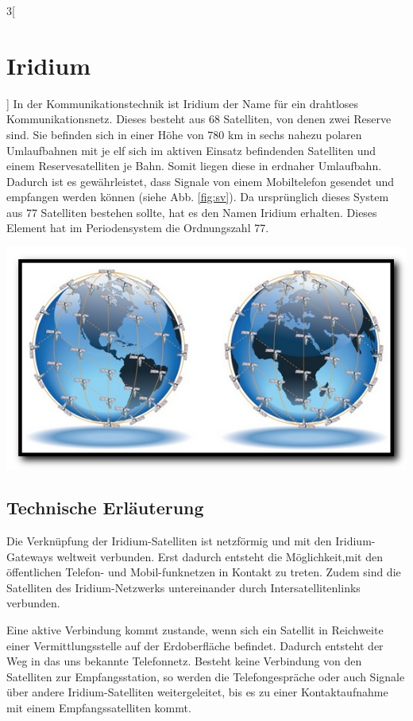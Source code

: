 \begin{multicols}{3}[\section{Iridium}]
In der Kommunikationstechnik ist Iridium der Name für ein drahtloses Kommunikationsnetz. Dieses besteht aus 68 Satelliten, von denen zwei Reserve sind. Sie befinden sich in einer Höhe von  780 km in sechs nahezu polaren Umlaufbahnen mit je elf sich im aktiven Einsatz befindenden Satelliten und einem Reservesatelliten je Bahn. Somit liegen diese in erdnaher Umlaufbahn. Dadurch ist es gewährleistet, dass Signale von einem Mobiltelefon gesendet und empfangen werden können (siehe Abb. \ref{fig:sv}).
Da ursprünglich dieses System aus 77 Satelliten bestehen sollte, hat es den Namen Iridium erhalten. Dieses Element hat im Periodensystem die Ordnungszahl 77.\cite{I3,I5}

\begin{Figure}
	\includegraphics[width=\linewidth]{Kapitel/Iridium/Grafiken/satellitenverteilung.jpg}
	\label{fig:sv}
\end{Figure}


\subsection*{Technische Erläuterung}
Die Verknüpfung der Iridium-Satelliten ist netzförmig und mit den Iridium-Gateways weltweit verbunden. Erst dadurch entsteht die Möglichkeit,mit den öffentlichen Telefon- und Mobil-funknetzen in Kontakt zu treten.
Zudem sind die Satelliten des Iridium-Netzwerks untereinander durch Intersatellitenlinks verbunden. 

Eine aktive Verbindung kommt zustande, wenn sich ein Satellit in Reichweite einer Vermittlungsstelle auf der Erdoberfläche befindet. Dadurch entsteht der Weg in das uns bekannte Telefonnetz. Besteht keine Verbindung von den Satelliten zur Empfangsstation, so werden die Telefongespräche oder auch Signale über andere Iridium-Satelliten weitergeleitet, bis es zu einer Kontaktaufnahme mit einem Empfangssatelliten kommt.


\end{multicols}
